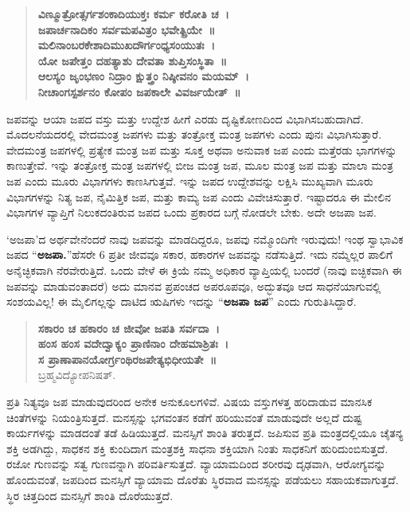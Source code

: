 {\begin{verse}
\textbf{ವಿಣ್ಮೂತ್ರೋತ್ಸರ್ಗಶಂಕಾದಿಯುಕ್ತಃ ಕರ್ಮ ಕರೋತಿ ಚ~। \\
ಜಪಾರ್ಚನಾದಿಕಂ ಸರ್ವಮಪವಿತ್ರಂ ಭವೇತ್ಪ್ರಿಯೇ~॥\\
ಮಲಿನಾಂಬರಕೇಶಾದಿಮುಖದೌರ್ಗಂಧ್ಯಸಂಯುತಃ~। \\
ಯೋ ಜಪೇತ್ತಂ ದಹತ್ಯಾಶು ದೇವತಾ ಶುಪ್ತಿಸಂಸ್ಥಿತಾ~॥\\
ಆಲಸ್ಯಂ ಜೃಂಭಣಂ ನಿದ್ರಾಂ ಕ್ಷುತ್ತ್ರಂ ನಿಷ್ಠೀವನಂ ಮಯಮ್~। \\
ನೀಚಾಂಗಸ್ಪರ್ಶನಂ ಕೋಪಂ ಜಪಕಾಲೇ ವಿವರ್ಜಯೇತ್~॥}
\end{verse}
ಜಪವನ್ನು ಆಯಾ ಜಪದ ವಸ್ತು ಮತ್ತು ಉದ್ದೇಶ ಹೀಗೆ ಎರಡು ದೃಷ್ಟಿಕೋಣದಿಂದ ವಿಭಾಗಿಸಬಹುದಾಗಿದೆ. ಮೊದಲನೆಯದರಲ್ಲಿ ವೇದಮಂತ್ರ ಜಪಗಳು ಮತ್ತು ತಂತ್ರೋಕ್ತ ಮಂತ್ರ ಜಪಗಳು ಎಂದು ಪುನಃ ವಿಭಾಗಿಸುತ್ತಾರೆ. ವೇದಮಂತ್ರ ಜಪಗಳಲ್ಲಿ ಪ್ರತ್ಯೇಕ ಮಂತ್ರ ಜಪ ಮತ್ತು ಸೂಕ್ತ ಅಥವಾ ಅನುವಾಕ ಜಪ ಎಂದು ಮತ್ತೆರಡು ಭಾಗ\-ಗಳನ್ನು ಕಾಣುತ್ತೇವೆ. ಇನ್ನು ತಂತ್ರೋಕ್ತ ಮಂತ್ರ ಜಪಗಳಲ್ಲಿ ಬೀಜ ಮಂತ್ರ ಜಪ, ಮೂಲ ಮಂತ್ರ ಜಪ ಮತ್ತು ಮಾಲಾ ಮಂತ್ರ ಜಪ ಎಂದು ಮೂರು ವಿಭಾಗಗಳು ಕಾಣಸಿಗುತ್ತವೆ. ಇನ್ನು ಜಪದ ಉದ್ದೇಶವನ್ನು ಲಕ್ಷಿಸಿ ಮುಖ್ಯವಾಗಿ ಮೂರು ವಿಭಾಗಗಳನ್ನು ನಿತ್ಯ ಜಪ, ನೈಮಿತ್ತಿಕ ಜಪ, ಮತ್ತು ಕಾಮ್ಯ ಜಪ ಎಂದು ವಿವೇಚಿಸುತ್ತಾರೆ. ಇಷ್ಟಾದರೂ ಈ ಮೇಲಿನ ವಿಭಾಗಗಳ ವ್ಯಾಪ್ತಿಗೆ ನಿಲುಕದಂತಿರುವ ಜಪದ ಒಂದು ಪ್ರಕಾರದ ಬಗ್ಗೆ ನೋಡಲೇ ಬೇಕು. ಅದೇ ಅಜಪಾ ಜಪ.

‘ಅಜಪಾ’ದ ಅರ್ಥವೇನೆಂದರೆ ನಾವು ಜಪವನ್ನು ಮಾಡದಿದ್ದರೂ, ಜಪವು ನಮ್ಮೊಂದಿಗೇ ಇರುವುದು! ಇಂಥ ಸ್ವಾಭಾವಿಕ ಜಪದ “\textbf{ಅಜಪಾ.}”ಹೆಸರೇ 6 ಪ್ರತೀ ಜೀವವೂ ಸಕಾರ, ಹಕಾರಗಳ ಜಪವನ್ನು ನಡೆಸುತ್ತಿದೆ. ಇದು ನಮ್ಮೆಲ್ಲರ ಪಾಲಿಗೆ ಅನೈಚ್ಛಿಕವಾಗಿ ನೆರವೇರುತ್ತಿದೆ. ಒಂದು ವೇಳೆ ಈ ಕ್ರಿಯೆ ನಮ್ಮ ಅಧಿಕಾರ ವ್ಯಾಪ್ತಿಯಲ್ಲಿ ಬಂದರೆ (ನಾವು ಐಚ್ಛಿಕ\-ವಾಗಿ ಈ ಜಪವನ್ನು ಮಾಡುವಂತಾದರೆ) ಅದು ಮಾನವ ಪ್ರಪಂಚದ ಅಪ\-ರೂಪವೂ, ಅದ್ಭುತವೂ ಆದ ಸಾಧನೆಯಾಗುವಲ್ಲಿ ಸಂಶಯವಿಲ್ಲ! ಈ ಮೈಲಿಗಲ್ಲನ್ನು ದಾಟಿದ ಋಷಿಗಳು ಇದನ್ನು “\textbf{ಅಜಪಾ ಜಪ}” ಎಂದು ಗುರುತಿಸಿದ್ದಾರೆ.
\begin{verse}
\textbf{ಸಕಾರಂ ಚ ಹಕಾರಂ ಚ ಜೀವೋ ಜಪತಿ ಸರ್ವದಾ~।  \\
ಹಂಸ ಹಂಸ ವದೇದ್ವಾಕ್ಯಂ ಪ್ರಾಣಿನಾಂ ದೇಹಮಾಶ್ರಿತಃ~। \\
ಸ ಪ್ರಾಣಾಪಾನಯೋರ್ಗ್ರಂಥಿರಜಪೇತ್ಯಭಿಧೀಯತೇ~॥}\\
\hspace{5cm}ಬ್ರಹ್ಮವಿದ್ಯೋಪನಿಷತ್.
\end{verse}
ಪ್ರತಿ ನಿತ್ಯವೂ ಜಪ ಮಾಡುವುದರಿಂದ ಅನೇಕ ಅನುಕೂಲಗಳಿವೆ. ವಿಷಯ ವಸ್ತುಗಳತ್ತ ಹರಿದಾಡುವ ಮಾನಸಿಕ ಚಿಂತೆಗಳನ್ನು ನಿಯಂತ್ರಿಸುತ್ತದೆ. ಮನಸ್ಸನ್ನು ಭಗವಂತನ ಕಡೆಗೆ ಹರಿಯುವಂತೆ ಮಾಡುವುದೇ ಅಲ್ಲದೆ ದುಷ್ಟ ಕಾರ್ಯಗಳನ್ನು ಮಾಡದಂತೆ ತಡೆ ಹಿಡಿಯುತ್ತದೆ. ಮನಸ್ಸಿಗೆ ಶಾಂತಿ ತರುತ್ತದೆ. ಜಪಿಸುವ ಪ್ರತಿ ಮಂತ್ರದಲ್ಲಿಯೂ ಚೈತನ್ಯ ಶಕ್ತಿ ಅಡಗಿದ್ದು, ಸಾಧಕನ ಶಕ್ತಿ ಕುಂದಿದಾಗ ಮಂತ್ರಶಕ್ತಿ ಸಾಧನಾ ಶಕ್ತಿಯಾಗಿ ನಿಂತು ಸಾಧಕ\-ನಿಗೆ ಹುರಿದುಂಬಿಸುತ್ತದೆ. ರಜೋ ಗುಣವನ್ನು ಸತ್ವ ಗುಣವನ್ನಾಗಿ ಪರಿವರ್ತಿಸುತ್ತದೆ. ವ್ಯಾಯಾಮದಿಂದ ಶರೀರವು ದೃಢವಾಗಿ, ಆರೋಗ್ಯವನ್ನು ಹೊಂದುವಂತೆ, ಜಪದಿಂದ ಮನಸ್ಸಿಗೆ ವ್ಯಾಯಾಮ ದೊರೆತು ಸ್ಥಿರವಾದ ಮನಸ್ಸನ್ನು ಪಡೆಯಲು ಸಹಾಯಕ\-ವಾಗುತ್ತದೆ. ಸ್ಥಿರ  ಚಿತ್ತದಿಂದ ಮನಸ್ಸಿಗೆ ಶಾಂತಿ ದೊರೆಯುತ್ತದೆ.

}
